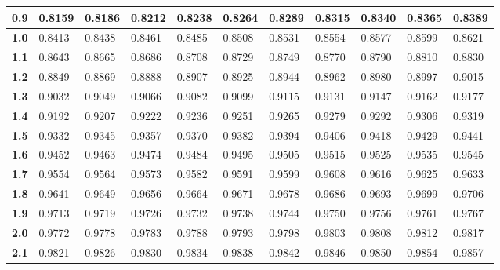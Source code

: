 \begin{longtable}{|l|l|l|l|l|l|l|l|l|l|l|}
    \textbf{0.9}  & 0.8159  & 0.8186  & 0.8212  & 0.8238  & 0.8264  & 0.8289  & 0.8315  & 0.8340  & 0.8365  & 0.8389\\ \hline
    
    \textbf{1.0}  & 0.8413  & 0.8438  & 0.8461  & 0.8485  & 0.8508  & 0.8531  & 0.8554  & 0.8577  & 0.8599  & 0.8621\\ \hline
    
    \textbf{1.1}  & 0.8643  & 0.8665  & 0.8686  & 0.8708  & 0.8729  & 0.8749  & 0.8770  & 0.8790  & 0.8810  & 0.8830\\ \hline
    
    \textbf{1.2}  & 0.8849  & 0.8869  & 0.8888  & 0.8907  & 0.8925  & 0.8944  & 0.8962  & 0.8980  & 0.8997  & 0.9015\\ \hline
    
    \textbf{1.3}  & 0.9032  & 0.9049  & 0.9066  & 0.9082  & 0.9099  & 0.9115  & 0.9131  & 0.9147  & 0.9162  & 0.9177\\ \hline
    
    \textbf{1.4}  & 0.9192  & 0.9207  & 0.9222  & 0.9236  & 0.9251  & 0.9265  & 0.9279  & 0.9292  & 0.9306  & 0.9319\\ \hline
    
    \textbf{1.5}  & 0.9332  & 0.9345  & 0.9357  & 0.9370  & 0.9382  & 0.9394  & 0.9406  & 0.9418  & 0.9429  & 0.9441\\ \hline
    
    \textbf{1.6}  & 0.9452  & 0.9463  & 0.9474  & 0.9484  & 0.9495  & 0.9505  & 0.9515  & 0.9525  & 0.9535  & 0.9545\\ \hline
    
    \textbf{1.7}  & 0.9554  & 0.9564  & 0.9573  & 0.9582  & 0.9591  & 0.9599  & 0.9608  & 0.9616  & 0.9625  & 0.9633\\ \hline
    
    \textbf{1.8}  & 0.9641  & 0.9649  & 0.9656  & 0.9664  & 0.9671  & 0.9678  & 0.9686  & 0.9693  & 0.9699  & 0.9706\\ \hline
    
    \textbf{1.9}  & 0.9713  & 0.9719  & 0.9726  & 0.9732  & 0.9738  & 0.9744  & 0.9750  & 0.9756  & 0.9761  & 0.9767\\ \hline
    
    \textbf{2.0}  & 0.9772  & 0.9778  & 0.9783  & 0.9788  & 0.9793  & 0.9798  & 0.9803  & 0.9808  & 0.9812  & 0.9817\\ \hline
    
    \textbf{2.1}  & 0.9821  & 0.9826  & 0.9830  & 0.9834  & 0.9838  & 0.9842  & 0.9846  & 0.9850  & 0.9854  & 0.9857\\ \hline
    

\end{longtable}
